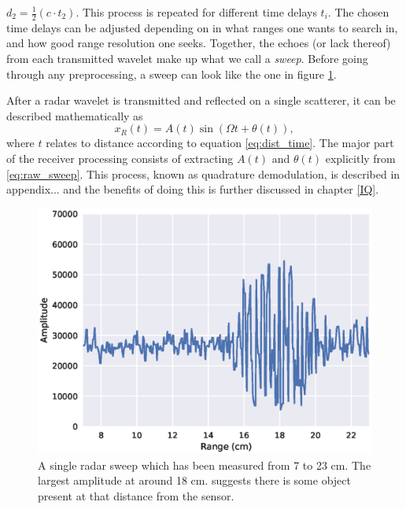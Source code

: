 $
	d_2 = \frac12(c\cdot t_2).
$
This process is repeated for different time delays $t_i$. The chosen time delays can be adjusted depending on in what ranges one wants to search in, and how good range resolution one seeks. Together, the echoes (or lack thereof) from each transmitted wavelet make up what we call a \textit{sweep}. Before going through any preprocessing, a sweep can look like the one in figure \ref{fig:single_sweep_raw}.

After a radar wavelet is transmitted and reflected on a single scatterer, it can be described mathematically as \citep{richards_2014}
\begin{equation}
	\label{eq:raw_sweep}
	x_R(t)=A(t)\sin(\Omega t +\theta (t)),
\end{equation}
where $t$ relates to distance according to equation \eqref{eq:dist_time}. The major part of the receiver processing consists of extracting $A(t)$ and $\theta(t)$ explicitly from \eqref{eq:raw_sweep}. This process, known as quadrature demodulation, is described in appendix... and the benefits of doing this is further discussed in chapter \ref{IQ}.

\begin{figure}[h]
	\centering
	\includegraphics[scale=0.7]{figs_temp/single_sweep_raw}
	\caption{A single radar sweep which has been measured from 7 to 23 cm. The largest amplitude at around 18 cm. suggests there is some object present at that distance from the sensor.}
	\label{fig:single_sweep_raw}
\end{figure}


